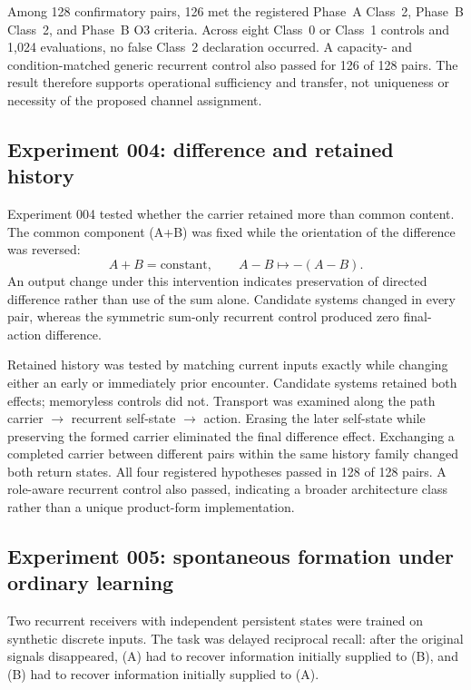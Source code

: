 \documentclass[11pt,a4paper]{article}
\begin{document}
Among 128 confirmatory pairs, 126 met the registered Phase~A Class~2, Phase~B Class~2, and Phase~B O3 criteria. Across eight Class~0 or Class~1 controls and 1,024 evaluations, no false Class~2 declaration occurred. A capacity- and condition-matched generic recurrent control also passed for 126 of 128 pairs. The result therefore supports operational sufficiency and transfer, not uniqueness or necessity of the proposed channel assignment.

\subsection{Experiment 004: difference and retained history}

Experiment 004 tested whether the carrier retained more than common content. The common component (A+B) was fixed while the orientation of the difference was reversed:
\begin{equation}
  A+B=\text{constant}, \qquad A-B \mapsto -(A-B).
\end{equation}
An output change under this intervention indicates preservation of directed difference rather than use of the sum alone. Candidate systems changed in every pair, whereas the symmetric sum-only recurrent control produced zero final-action difference.

Retained history was tested by matching current inputs exactly while changing either an early or immediately prior encounter. Candidate systems retained both effects; memoryless controls did not. Transport was examined along the path carrier \(\rightarrow\) recurrent self-state \(\rightarrow\) action. Erasing the later self-state while preserving the formed carrier eliminated the final difference effect. Exchanging a completed carrier between different pairs within the same history family changed both return states. All four registered hypotheses passed in 128 of 128 pairs. A role-aware recurrent control also passed, indicating a broader architecture class rather than a unique product-form implementation.

\subsection{Experiment 005: spontaneous formation under ordinary learning}

Two recurrent receivers with independent persistent states were trained on synthetic discrete inputs. The task was delayed reciprocal recall: after the original signals disappeared, (A) had to recover information initially supplied to (B), and (B) had to recover information initially supplied to (A).
\end{document}
